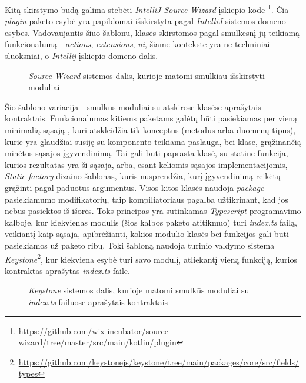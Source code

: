 Kitą skirstymo būdą galima stebėti \textit{IntelliJ Source Wizard} įskiepio kode \footnote{\url{https://github.com/wix-incubator/source-wizard/tree/master/src/main/kotlin/plugin}}.
Čia \textit{plugin} paketo esybė yra papildomai išskirstyta pagal \textit{IntelliJ} sistemos domeno esybes.
Vadovaujantis šiuo šablonu, klasės skirstomos pagal smulkesnį jų teikiamą funkcionalumą - \textit{actions}, \textit{extensions}, \textit{ui},
šiame kontekste yra ne techniniai sluoksniai, o \textit{Intellij} įskiepio domeno dalis.
\begin{figure}[H]
    \snugshade
    \endsnugshade
    \caption{\textit{Source Wizard} sistemos dalis, kurioje matomi smulkiau išskirstyti moduliai}
\end{figure}

Šio šablono variacija - smulkūs moduliai su atskirose klasėse aprašytais kontraktais.
Funkcionalumas kitiems paketams galėtų būti pasiekiamas per vieną minimalią sąsają ,
kuri atskleidžia tik konceptus (metodus arba duomenų tipus), kurie yra glaudžiai susiję su komponento teikiama paslauga, bei
klase, grąžinančią minėtos sąsajos įgyvendinimą.
Tai gali būti paprasta klasė, su statine funkcija, kurios rezultatas yra ši sąsaja, arba, esant keliomis sąsajos implementacijomis,
\textit{Static factory} dizaino šablonas, kuris nusprendžia, kurį įgyvendinimą reikėtų grąžinti pagal paduotus argumentus.
Visos kitos klasės naudoja \textit{package} pasiekiamumo modifikatorių, taip kompiliatoriaus pagalba užtikrinant,
kad jos nebus pasiektos iš išorės.
Toks principas yra sutinkamas \textit{Typescript} programavimo kalboje, kur kiekvienas modulis (šios kalbos paketo atitikmuo) turi
\textit{index.ts} failą, veikiantį kaip sąsaja, apibrėžianti, kokios modulio klasės bei funkcijos gali būti pasiekiamos už paketo ribų.
Toki šabloną naudoja turinio valdymo sistema \textit{Keystone}\footnote{\url{https://github.com/keystonejs/keystone/tree/main/packages/core/src/fields/types}},
kur kiekviena esybė turi savo modulį, atliekantį vieną funkciją, kurios kontraktas aprašytas \textit{index.ts} faile.

\begin{figure}[H]
    \snugshade
    \endsnugshade
    \caption{\textit{Keystone} sistemos dalis, kurioje matomi smulkūs moduliai su \textit{index.ts} failuose aprašytais kontraktais}
\end{figure}

